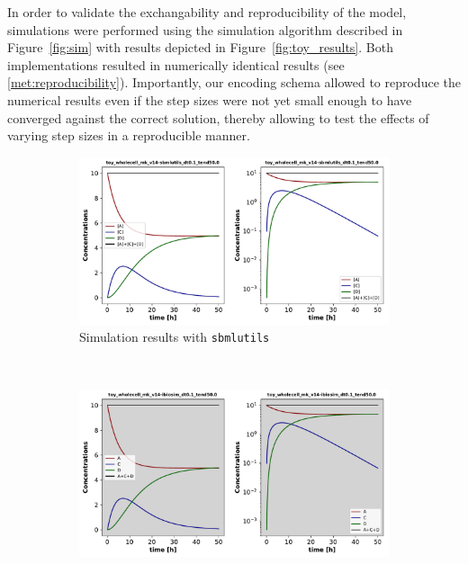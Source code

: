 \documentclass{bioinfo}
\begin{document}
In order to validate the exchangability and reproducibility of the model, simulations were performed using the simulation algorithm described in Figure~\ref{fig:sim} with results depicted in Figure~\ref{fig:toy_results}. Both implementations resulted in numerically identical results (see \ref{met:reproducibility}).
Importantly, our encoding schema allowed to reproduce the numerical results even if the step sizes were not yet small enough to have converged against the correct solution, thereby allowing to test the effects of varying step sizes in a reproducible manner.

\begin{figure}[!t]
\begin{subfigure}[t]{0.5\textwidth}	\centerline{\includegraphics[width=\linewidth]{figures/Fig4_toy_wholecell_mk_v14-sbmlutils_dt0_1_tend50_0.pdf}}
	\caption{Simulation results with \texttt{sbmlutils}}\label{fig:sbmlutils_toy_results}
\end{subfigure}
~
\begin{subfigure}[t]{0.5\textwidth}	\centerline{\includegraphics[width=\linewidth]{figures/Fig4_toy_wholecell_mk_v14-ibiosim_dt0_1_tend50_0.pdf}}

\end{subfigure}
\end{figure}
\end{document}

